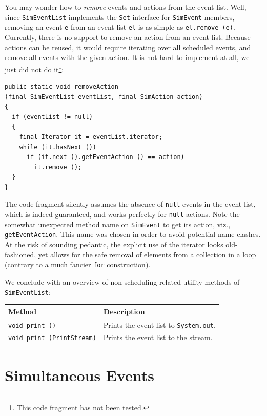 \documentclass[12pt]{book}
\begin{document}
You may wonder how to {\em remove\/} events and actions from the event list.
Well, since \lstinline{SimEventList} implements the \lstinline{Set} interface for
  \lstinline{SimEvent} members, removing an event \lstinline{e}
  from an event list \lstinline{el} is as simple as
  \lstinline{el.remove (e)}.
Currently, there is no support to remove an action from an event list.
Because actions can be reused, it would require iterating over
  all scheduled events,
  and remove all events with the given action.
It is not hard to implement at all, we just did not do it\footnote{
This code fragment has not been tested.}:
\begin{lstlisting}[basicstyle=\tiny]
public static void removeAction
(final SimEventList eventList, final SimAction action)
{
  if (eventList != null)
  {
    final Iterator it = eventList.iterator;
    while (it.hasNext ())
      if (it.next ().getEventAction () == action)
        it.remove ();
  }
}
\end{lstlisting}
The code fragment silently assumes
  the absence of \lstinline{null} events
  in the event list,
  which is indeed guaranteed,
  and works perfectly for \lstinline{null} actions.
Note the somewhat unexpected method name on \lstinline{SimEvent}
  to get its action, viz., \lstinline{getEventAction}.
This name was chosen in order to avoid potential name clashes.
At the risk of sounding pedantic,
  the explicit use of the iterator
  looks old-fashioned,
  yet allows for
  the safe removal of elements
  from a collection in a loop
  (contrary to a much fancier \lstinline{for} construction).

We conclude with an overview of
  non-scheduling related utility methods
  of \lstinline{SimEventList}:

\begin{tabular}{|l|l|}
  \hline
  {\bf Method} & {\bf Description} \\
  \hline
  \lstinline[basicstyle=\footnotesize]!void print ()! & Prints the event list to \lstinline!System.out!. \\
  \lstinline[basicstyle=\footnotesize]!void print (PrintStream)! & Prints the event list to the stream. \\
  \hline
\end{tabular}

\section{Simultaneous Events}
\end{document}
